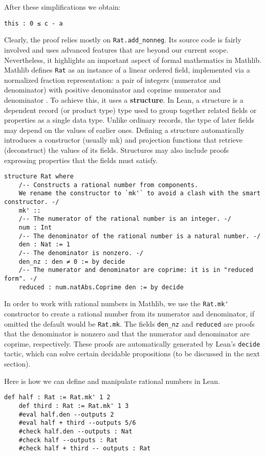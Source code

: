 After these simplifications we obtain:
\begin{lstlisting}[language=lean]
  this : 0 ≤ c - a
\end{lstlisting}
Clearly, the proof relies mostly on \lstinline[language=lean]|Rat.add_nonneg|. 
Its source code is fairly involved and uses advanced features 
that are beyond our current scope. Nevertheless, it highlights 
an important aspect of formal mathematics in Mathlib.
Mathlib defines \lstinline[language=lean]|Rat| as an instance of 
a linear ordered field, implemented via a normalized fraction 
representation: a pair of integers (numerator and denominator) 
with positive denominator and coprime numerator and denominator \cite{mathlibdoc}. 
To achieve this, it uses a \textbf{structure}. In Lean, a structure is a dependent record 
(or product type) type  used to group together related fields or properties as a single data type.
Unlike ordinary records, the type of later fields may depend on the values of earlier ones.
Defining a structure automatically introduces a constructor (usually mk) and projection 
functions that retrieve (deconstruct) the values of its fields.
Structures may also include proofs expressing properties that the fields must satisfy.
\begin{lstlisting}[language=lean]
  structure Rat where
    /-- Constructs a rational number from components.
    We rename the constructor to `mk'` to avoid a clash with the smart constructor. -/
    mk' ::
    /-- The numerator of the rational number is an integer. -/
    num : Int
    /-- The denominator of the rational number is a natural number. -/
    den : Nat := 1
    /-- The denominator is nonzero. -/
    den_nz : den ≠ 0 := by decide
    /-- The numerator and denominator are coprime: it is in "reduced form". -/
    reduced : num.natAbs.Coprime den := by decide
\end{lstlisting}
In order to work with rational numbers in Mathlib, we use the
\lstinline[language=lean]|Rat.mk'| constructor to create a rational number from
its numerator and denominator, if omitted the default would be \lstinline[language=lean]|Rat.mk|.
The fields \lstinline[language=lean]|den_nz| and \lstinline[language=lean]|reduced| are proofs that 
the denominator is nonzero and that the numerator and denominator are coprime, respectively. 
These proofs are automatically generated by Lean's \lstinline[language=lean]|decide| tactic, which can 
solve certain decidable propositions (to be discussed in the next section).
\begin{example} 
  Here is how we can define and manipulate rational numbers in Lean.
  \begin{lstlisting}[language=lean]
    def half : Rat := Rat.mk' 1 2
    def third : Rat := Rat.mk' 1 3
    #eval half.den --outputs 2
    #eval half + third --outputs 5/6
    #check half.den --outputs : Nat
    #check half --outputs : Rat
    #check half + third -- outputs : Rat
  \end{lstlisting}
\end{example}
